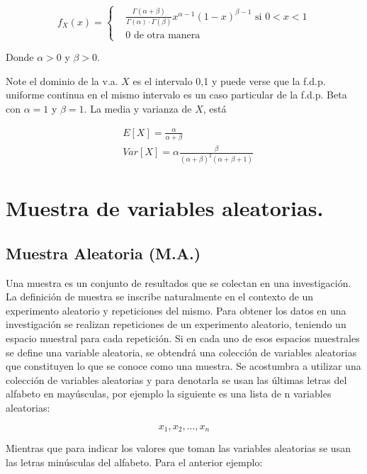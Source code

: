 \begin{equation}
    f_X(x)=\begin{cases}
         & \frac{\Gamma (\alpha +\beta )}{\Gamma (\alpha )\cdot \Gamma (\beta )}x^{\alpha -1}(1-x)^{\beta -1}\text{ si } 0<x<1
        \\& 0 \text{ de otra manera}\end{cases}
\end{equation}

Donde $\alpha >0$ y $\beta >0.$

Note el dominio de la v.a. $X$ es el intervalo 0,1 y puede
verse que la f.d.p. uniforme continua en el mismo intervalo
es un caso particular de la f.d.p. Beta con $\alpha =1$ y $\beta =1$.
La media y varianza de $X$, está

\begin{align}
     & E\left[X\right]=\frac{\alpha}{\alpha +\beta}                                \\
     & Var\left[X\right] =\alpha\frac{\beta}{(\alpha +\beta )^2(\alpha +\beta +1)}
\end{align}

\section{Muestra de variables aleatorias.}

\subsection{Muestra Aleatoria (M.A.)}

Una muestra es un conjunto de resultados que se colectan en una investigación. La definición de muestra se inscribe naturalmente en el contexto de un experimento aleatorio y repeticiones del mismo. Para obtener los datos en una investigación se realizan repeticiones de un experimento aleatorio, teniendo un espacio muestral para cada repetición. Si en cada uno de esos espacios muestrales se define una variable aleatoria, se obtendrá una colección de variables aleatorias que constituyen lo que se conoce como una muestra. Se acostumbra a utilizar una colección de variables aleatorias y para denotarla se usan las últimas letras del alfabeto en mayúsculas, por ejemplo la siguiente es una lista de n variables aleatorias:

\begin{equation*}
    x_1,x_2,\dots ,x_n
\end{equation*}

Mientras que para indicar los valores que toman las variables aleatorias se usan las letras minúsculas del alfabeto. Para el anterior ejemplo:

